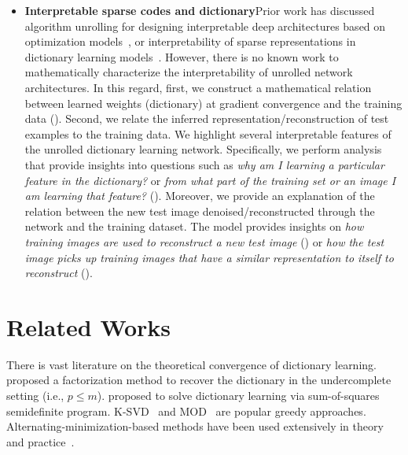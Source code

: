 \documentclass[10pt]{article} %
\begin{document}
\begin{itemize}[noitemsep, topsep=0pt, leftmargin=12pt]
%
\item {\bf Interpretable sparse codes and dictionary}\quad Prior work has discussed algorithm unrolling for designing interpretable deep architectures based on optimization models~\citep{monga2019algorithm}, or interpretability of sparse representations in dictionary learning models~\citep{kim2010intersparsecodingvision}. However, there is no known work to mathematically characterize the interpretability of unrolled network architectures. In this regard, first, we construct a mathematical relation between learned weights (dictionary) at gradient convergence and the training data (). Second, we relate the inferred representation/reconstruction of test examples to the training data. We highlight several interpretable features of the unrolled dictionary learning network. Specifically, we perform analysis that provide insights into questions such as {\it why am I learning a particular feature in the dictionary?} or {\it from what part of the training set or an image I am learning that feature?} (). Moreover, we provide an explanation of the relation between the new test image denoised/reconstructed through the network and the training dataset. The model provides insights on {\it how training images are used to reconstruct a new test image} () or {\it how the test image picks up training images that have a similar representation to itself to reconstruct} (). 
\end{itemize}
%
\section{Related Works} 
%
There is vast literature on the theoretical convergence of dictionary learning. \citet{spielman2021sparsedict} proposed a factorization method to recover the dictionary in the undercomplete setting (i.e., $p \leq m$). \citet{barak2015dlsumofsq} proposed to solve dictionary learning via sum-of-squares semidefinite program. K-SVD~\citep{aharon2006ksvd} and MOD~\citep{engan1999mod} are popular greedy approaches. Alternating-minimization-based methods have been used extensively in theory and practice~\citep{Jain2013lowrank, agarwal2014overdl, arora2014overdl}.
\end{document}
